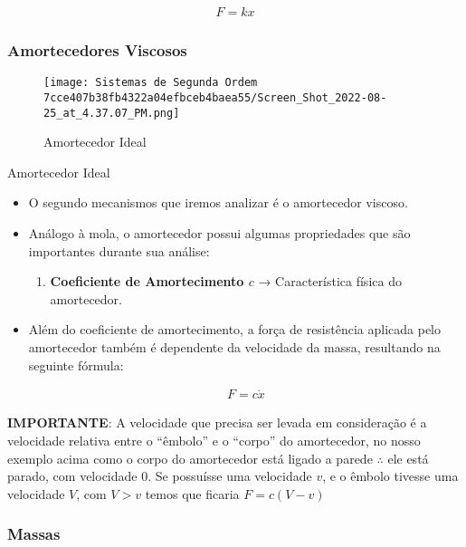 \documentclass{article}
\begin{document}
\begin{itemize}
\begin{itemize}
  \[
    \begin{align}
    F = kx
    \end{align}
    \]
\end{itemize}

\hypertarget{amortecedores-viscosos}{%
\subsubsection{Amortecedores Viscosos}\label{amortecedores-viscosos}}

\begin{figure}
\centering
\texttt{[image: Sistemas de Segunda Ordem 7cce407b38fb4322a04efbceb4baea55/Screen\_Shot\_2022-08-25\_at\_4.37.07\_PM.png]}
\caption{Amortecedor Ideal}
\end{figure}

Amortecedor Ideal

\begin{itemize}
\item
  O segundo mecanismos que iremos analizar é o amortecedor viscoso.
\item
  Análogo à mola, o amortecedor possui algumas propriedades que são
  importantes durante sua análise:

  \begin{enumerate}
  \def\labelenumi{\arabic{enumi}.}
  \tightlist
  \item
    \textbf{Coeficiente de Amortecimento \(c\)} → Característica física
    do amortecedor.
  \end{enumerate}
\item
  Além do coeficiente de amortecimento, a força de resistência aplicada
  pelo amortecedor também é dependente da velocidade da massa,
  resultando na seguinte fórmula:

  \[
    \begin{align}
    F = c\dot x
    \end{align}
    \]
\end{itemize}

\textbf{IMPORTANTE}: A velocidade que precisa ser levada em consideração
é a velocidade relativa entre o ``êmbolo'' e o ``corpo'' do amortecedor,
no nosso exemplo acima como o corpo do amortecedor está ligado a parede
\(\therefore\) ele está parado, com velocidade 0. Se possuísse uma
velocidade \(v\), e o êmbolo tivesse uma velocidade \(V\), com \(V > v\)
temos que ficaria \(F = c(V-v)\)

\hypertarget{massas}{%
\subsubsection{Massas}\label{massas}}


\end{itemize}
\end{document}
